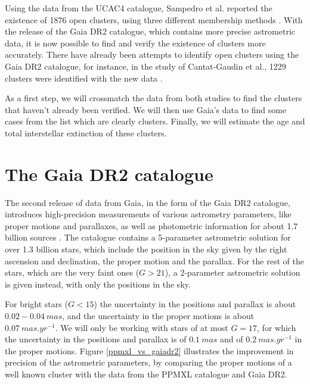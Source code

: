 \documentclass[twocolumn]{revtex4}
\begin{document}
Using the data from the UCAC4 catalogue, Sampedro et al. reported the existence of 1876 open clusters, using three different membership methods \cite{sampedro}. With the release of the Gaia DR2 catalogue, which contains more precise astrometric data, it is now possible to find and verify the existence of clusters more accurately.
There have already been attempts to identify open clusters using the Gaia DR2 catalogue, for instance, in the study of Cantat-Gaudin et al., 1229 clusters were identified with the new data \cite{cantat-gaudin}.

As a first step, we will crossmatch the data from both studies to find the clusters that haven't already been verified. We will then use Gaia's data to find some cases from the list which are clearly clusters. Finally, we will estimate the age and total interstellar extinction of these clusters.

\section{The Gaia DR2 catalogue}
The second release of data from Gaia, in the form of the Gaia DR2 catalogue, introduces high-precision measurements of various astrometry parameters, like proper motions and parallaxes, as well as photometric information for about 1.7 billion sources \cite{gaiadr2}. The catalogue contains a 5-parameter astrometric solution for over 1.3 billion stars, which include the position in the sky given by the right ascension and declination, the proper motion and the parallax. For the rest of the stars, which are the very faint ones ($G > 21$), a 2-parameter astrometric solution is given instead, with only the positions in the sky.

For bright stars ($G < 15$) the uncertainty in the positions and parallax is about $0.02-0.04\ \si{mas}$, and the uncertainty in the proper motions is about $0.07\ \si{mas.yr^{-1}}$. We will only be working with stars of at most $G = 17$, for which the uncertainty in the positions and parallax is of $0.1\ \si{mas}$ and of $0.2\ \si{mas.yr^{-1}}$ in the proper motions. Figure \ref{ppmxl_vs_gaiadr2} illustrates the improvement in precision of the astrometric parameters, by comparing the proper motions of a well known cluster with the data from the PPMXL catalogue \cite{ppmxl} and Gaia DR2.
\end{document}
